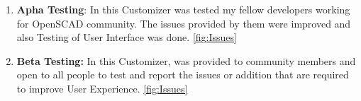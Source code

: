 \begin{enumerate}
	\item \textbf{Apha Testing}: In this Customizer was tested my fellow developers working for OpenSCAD community. The issues provided by them were improved and also Testing of User Interface was done. \ref{fig:Issues}
	
	\item \textbf{Beta Testing:} In this Customizer, was provided to community members and open to all people to test and report the issues or addition that are required to improve User Experience. \ref{fig:Issues}
	
\end{enumerate}


